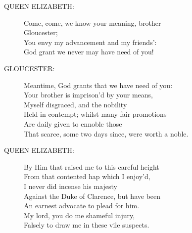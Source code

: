 \documentclass{article}
\begin{document}
\begin{description}
\item[QUEEN ELIZABETH:] 
\hspace{1pt}Come, come, we know your meaning, brother\\
\hspace{1pt}Gloucester;\\
\hspace{1pt}You envy my advancement and my friends':\\
\hspace{1pt}God grant we never may have need of you!\\
\end{description}
\begin{description}
\item[GLOUCESTER:] 
\hspace{1pt}Meantime, God grants that we have need of you:\\
\hspace{1pt}Your brother is imprison'd by your means,\\
\hspace{1pt}Myself disgraced, and the nobility\\
\hspace{1pt}Held in contempt; whilst many fair promotions\\
\hspace{1pt}Are daily given to ennoble those\\
\hspace{1pt}That scarce, some two days since, were worth a noble.\\
\end{description}
\begin{description}
\item[QUEEN ELIZABETH:] 
\hspace{1pt}By Him that raised me to this careful height\\
\hspace{1pt}From that contented hap which I enjoy'd,\\
\hspace{1pt}I never did incense his majesty\\
\hspace{1pt}Against the Duke of Clarence, but have been\\
\hspace{1pt}An earnest advocate to plead for him.\\
\hspace{1pt}My lord, you do me shameful injury,\\
\hspace{1pt}Falsely to draw me in these vile suspects.\\
\end{description}
\end{document}

